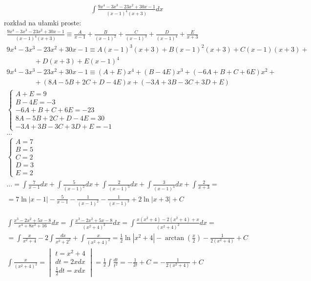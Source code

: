 \begin{gather*}\int \frac{9x^4-3x^3-23x^2+30x-1}{(x-1)^4(x+3)}dx\end{gather*}
rozkład na ułamki proste:
\begin{gather*}\frac{9x^4-3x^3-23x^2+30x-1}{(x-1)^4(x+3)} \equiv \frac{A}{x-1}+ \frac{B}{(x-1)^2}+ \frac{C}{(x-1)^3}+ \frac{D}{(x-1)^4}+ \frac{E}{x+3} \\
9x^4-3x^3-23x^2+30x-1 \equiv A(x-1)^3(x+3)+B(x-1)^2(x+3)+C(x-1)(x+3)+ \\
  \qquad \qquad +D(x+3)+E(x-1)^4 \\
9x^4-3x^3-23x^2+30x-1 \equiv (A+E)x^4+(B-4E)x^3+ (-6A+B+C+6E)x^2+ \\
  \qquad \qquad +(8A-5B+2C+D-4E)x+(-3A+3B-3C+3D+E) \\
\begin{cases} A+E=9 \\ B-4E=-3 \\ -6A+B+C+6E=-23 \\ 8A-5B+2C+D-4E=30 \\ -3A+3B-3C+3D+E=-1 \end{cases} \\
\ldots \\
\begin{cases} A=7 \\ B=5 \\ C=2 \\ D=3 \\ E=2 \end{cases} \\
\ldots = \int \frac{7}{x-1}dx + \int \frac{5}{(x-1)^2}dx + \int \frac{2}{(x-1)^3}dx + \int \frac{3}{(x-1)^4}dx + \int \frac{2}{x+3} = \\
= 7\ln|x-1|-\frac{5}{x-1}-\frac{1}{(x-1)^2}-\frac{1}{(x-1)^3}+2\ln|x+3|+C\end{gather*}



\begin{gather*}\int \frac{x^3-2x^2+5x-8}{x^4+8x^2+16}dx = \int \frac{x^3-2x^2+5x-8}{(x^2+4)^2}dx = \int \frac{x(x^2+4)-2(x^2+4)+x}{(x^2+4)^2}dx = \\
= \int \frac{x}{x^2+4}-2\int \frac{dx}{x^2+2^2}+\int \frac{x}{(x^2+4)^2}= \frac{1}{2}\ln|x^2+4|-\arctan \left( \frac{x}{2} \right) - \frac{1}{2(x^2+4)}+C \\
\int \frac{x}{(x^2+4)^2} = \begin{vmatrix} t=x^2+4 \\ dt=2xdx \\ \frac{1}{2}dt=xdx \end{vmatrix} = \frac{1}{2} \int \frac{dt}{t^2} = -\frac{1}{2t}+C = -\frac{1}{2(x^2+4)}+C\end{gather*}


